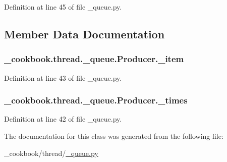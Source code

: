 Definition at line 45 of file \-\_\-queue.\-py.



\subsection{Member Data Documentation}
\hypertarget{class__cookbook_1_1thread_1_1__queue_1_1Producer_a5e71317515657aac1ad3839ab924c714}{
\subsubsection[{\-\_\-item}]{\setlength{\rightskip}{0pt plus 5cm}\-\_\-cookbook.\-thread.\-\_\-queue.\-Producer.\-\_\-item\hspace{0.3cm}{\ttfamily [private]}}}\label{class__cookbook_1_1thread_1_1__queue_1_1Producer_a5e71317515657aac1ad3839ab924c714}


Definition at line 43 of file \-\_\-queue.\-py.

\hypertarget{class__cookbook_1_1thread_1_1__queue_1_1Producer_a685676fd503fe7d392b581506a7b3e8f}{
\subsubsection[{\-\_\-times}]{\setlength{\rightskip}{0pt plus 5cm}\-\_\-cookbook.\-thread.\-\_\-queue.\-Producer.\-\_\-times\hspace{0.3cm}{\ttfamily [private]}}}\label{class__cookbook_1_1thread_1_1__queue_1_1Producer_a685676fd503fe7d392b581506a7b3e8f}


Definition at line 42 of file \-\_\-queue.\-py.



The documentation for this class was generated from the following file\-:\begin{DoxyCompactItemize}
\item 
\-\_\-cookbook/thread/\hyperlink{__queue_8py}{\-\_\-queue.\-py}\end{DoxyCompactItemize}
